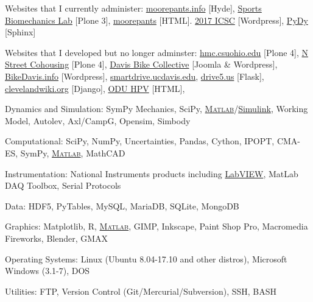 \documentclass[10pt]{article}
\newcommand{\blankline}{\quad\pagebreak[2]}
\begin{document}
\blankline

Websites that I currently administer:
\href{http://moorepants.info}{moorepants.info} [Hyde],
\href{http://biosport.ucdavis.edu}{Sports Biomechanics Lab} [Plone 3],
\href{http://moorepants.info/jkm}{moorepants} [HTML].
\href{http://icsc2017.ucdavis.edu}{2017 ICSC} [Wordpress],
\href{http://pydy.org}{PyDy} [Sphinx]

\blankline

Websites that I developed but no longer adminster:
\href{http://hmc.csuohio.edu}{hmc.csuohio.edu} [Plone 4],
\href{http://www.nstreetcohousing.org}{N Street Cohousing} [Plone 4],
\href{http://www.davisbikecollective.org}{Davis Bike Collective} [Joomla \& Wordpress],
\href{http://www.bikedavis.info}{BikeDavis.info} [Wordpress],
\href{http://smartdrive.ucdavis.edu}{smartdrive.ucdavis.edu},
\href{http://drive5.us}{drive5.us} [Flask],
\href{http://clevelandwiki.org}{clevelandwiki.org} [Django],
\href{http://www.lions.odu.edu/~dlandman/hpv/}{ODU HPV} [HTML],

\blankline

Dynamics and Simulation: SymPy Mechanics, SciPy,
\href{http://www.mathworks.com/products/matlab/}{\textsc{Matlab}}/\href{http://www.mathworks.com/products/simulink/}{Simulink},
Working Model, Autolev, Axl/CampG, Opensim, Simbody

\blankline

Computational:
SciPy, NumPy, Uncertainties, Pandas, Cython, IPOPT, CMA-ES, SymPy,
\href{http://www.mathworks.com/products/matlab/}{\textsc{Matlab}}, MathCAD


\blankline

Instrumentation: National Instruments products including
\href{http://www.ni.com/}{LabVIEW}, MatLab DAQ Toolbox, Serial Protocols

\blankline

Data: HDF5, PyTables, MySQL, MariaDB, SQLite, MongoDB

\blankline

Graphics: Matplotlib, R,
\href{http://www.mathworks.com/products/matlab/}{\textsc{Matlab}}, GIMP,
Inkscape, Paint Shop Pro, Macromedia Fireworks, Blender, GMAX

\blankline

Operating Systems: Linux (Ubuntu 8.04-17.10 and other distros), Microsoft
Windows (3.1-7), DOS

\blankline

Utilities: FTP, Version Control (Git/Mercurial/Subversion), SSH, BASH
\end{document}
